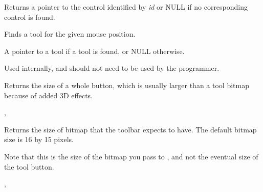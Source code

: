 
Returns a pointer to the control identified by {\it id} or
NULL if no corresponding control is found.

\label{wxtoolbarfindtoolforposition}


Finds a tool for the given mouse position.





A pointer to a tool if a tool is found, or NULL otherwise.


Used internally, and should not need to be used by the programmer.

\label{wxtoolbargettoolsize}


Returns the size of a whole button, which is usually larger than a tool bitmap because
of added 3D effects.


,\rtfsp
{}

\label{wxtoolbargettoolbitmapsize}


Returns the size of bitmap that the toolbar expects to have. The default bitmap size is 16 by 15 pixels.


Note that this is the size of the bitmap you pass to ,
and not the eventual size of the tool button.


,\rtfsp
{}

\label{wxtoolbargetmargins}

